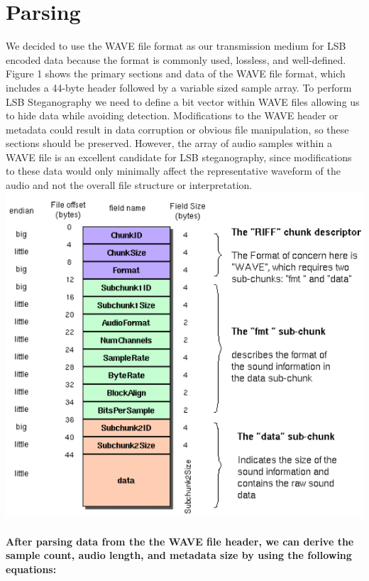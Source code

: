 \section{Parsing}
We decided to use the WAVE file format as our transmission medium for LSB encoded data because the format is commonly used, lossless, and well-defined. Figure 1 shows the primary sections and data of the WAVE file format, which includes a 44-byte header followed by a variable sized sample array. To perform LSB Steganography we need to define a bit vector within WAVE files allowing us to hide data while avoiding detection. Modifications to the WAVE header or metadata could result in data corruption or obvious file manipulation, so these sections should be preserved. However, the array of audio samples within a WAVE file is an excellent candidate for LSB steganography, since modifications to these data would only minimally affect the representative waveform of the audio and not the overall file structure or interpretation.
\newline
\noindent
\includegraphics[width=\columnwidth]{images/WaveFormat.png}
\paragraph{{\normalfont After parsing data from the the WAVE file header, we can derive the sample count, audio length, and metadata size by using the following equations:}}

